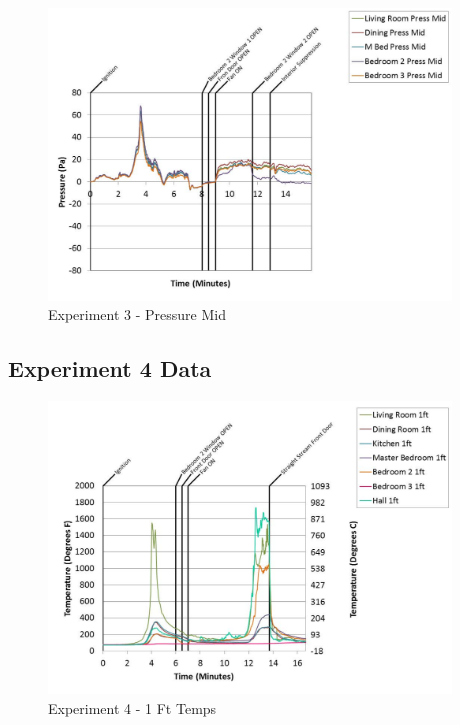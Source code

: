 \documentclass{article}
\begin{document}
\begin{appendices}
	\clearpage

	\begin{figure}[h!]
		\centering
		\includegraphics[height=3.05in]{0_Images/Results_Charts/Exp_3_Charts/PressureMid.pdf}
		\caption{Experiment 3 - Pressure Mid}
	\end{figure}
 

		\clearpage
\clearpage		\large
\subsection{Experiment 4 Data} \label{App:Exp4Results} 

	\begin{figure}[h!]
		\centering
		\includegraphics[height=3.05in]{0_Images/Results_Charts/Exp_4_Charts/1FtTemps.pdf}
		\caption{Experiment 4 - 1 Ft Temps}
	\end{figure}
 


\end{appendices}
\end{document}
